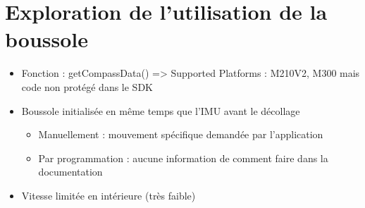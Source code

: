 \documentclass[12pt]{beamer}
\begin{document}
	\section{Exploration de l'utilisation de la boussole}
	\begin{frame}
	    \begin{block}{}
	        \begin{itemize}
	            [triangle]
	            \item Fonction  : getCompassData() => Supported Platforms : M210V2, M300 mais code non protégé dans le SDK
	            \item Boussole initialisée en même temps que l'IMU avant le décollage
	                \begin{itemize}
	                    [cercle]
	                    \item Manuellement : mouvement spécifique demandée par l'application
	                    \item Par programmation : aucune information de comment faire dans la documentation
	                \end{itemize}
	           \item Vitesse limitée en intérieure (très faible)
	        \end{itemize}
	    \end{block}
	\end{frame}
\end{document}
